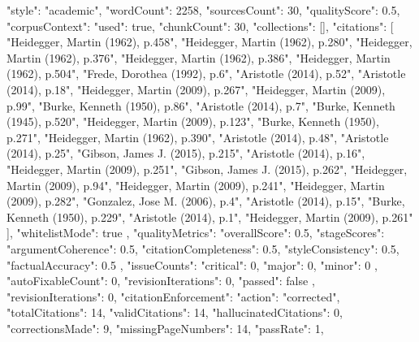 {{    "style": "academic",
    "wordCount": 2258,
    "sourcesCount": 30,
    "qualityScore": 0.5,
    "corpusContext": {
      "used": true,
      "chunkCount": 30,
      "collections": [],
      "citations": [
        "Heidegger, Martin (1962), p.458",
        "Heidegger, Martin (1962), p.280",
        "Heidegger, Martin (1962), p.376",
        "Heidegger, Martin (1962), p.386",
        "Heidegger, Martin (1962), p.504",
        "Frede, Dorothea (1992), p.6",
        "Aristotle (2014), p.52",
        "Aristotle (2014), p.18",
        "Heidegger, Martin (2009), p.267",
        "Heidegger, Martin (2009), p.99",
        "Burke, Kenneth (1950), p.86",
        "Aristotle (2014), p.7",
        "Burke, Kenneth (1945), p.520",
        "Heidegger, Martin (2009), p.123",
        "Burke, Kenneth (1950), p.271",
        "Heidegger, Martin (1962), p.390",
        "Aristotle (2014), p.48",
        "Aristotle (2014), p.25",
        "Gibson, James J. (2015), p.215",
        "Aristotle (2014), p.16",
        "Heidegger, Martin (2009), p.251",
        "Gibson, James J. (2015), p.262",
        "Heidegger, Martin (2009), p.94",
        "Heidegger, Martin (2009), p.241",
        "Heidegger, Martin (2009), p.282",
        "Gonzalez, Jose M. (2006), p.4",
        "Aristotle (2014), p.15",
        "Burke, Kenneth (1950), p.229",
        "Aristotle (2014), p.1",
        "Heidegger, Martin (2009), p.261"
      ],
      "whitelistMode": true
    },
    "qualityMetrics": {
      "overallScore": 0.5,
      "stageScores": {
        "argumentCoherence": 0.5,
        "citationCompleteness": 0.5,
        "styleConsistency": 0.5,
        "factualAccuracy": 0.5
      },
      "issueCounts": {
        "critical": 0,
        "major": 0,
        "minor": 0
      },
      "autoFixableCount": 0,
      "revisionIterations": 0,
      "passed": false
    },
    "revisionIterations": 0,
    "citationEnforcement": {
      "action": "corrected",
      "totalCitations": 14,
      "validCitations": 14,
      "hallucinatedCitations": 0,
      "correctionsMade": 9,
      "missingPageNumbers": 14,
      "passRate": 1,
}}}
